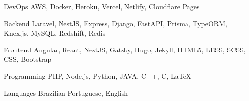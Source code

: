 

\begin{cvskills}

  \cvskill
    {DevOps} %
    {AWS, Docker, Heroku, Vercel, Netlify, Cloudflare Pages} %

  \cvskill
    {Backend} %
    {Laravel, NestJS, Express, Django, FastAPI, Prisma, TypeORM, Knex.js, MySQL, Redshift, Redis} %

  \cvskill
    {Frontend} %
    {Angular, React, NestJS, Gatsby, Hugo, Jekyll, HTML5, LESS, SCSS, CSS, Bootstrap} %

  \cvskill
    {Programming} %
    {PHP, Node.js, Python, JAVA, C++, C, LaTeX} %

  \cvskill
    {Languages} %
    {Brazilian Portuguese, English} %

\end{cvskills}
